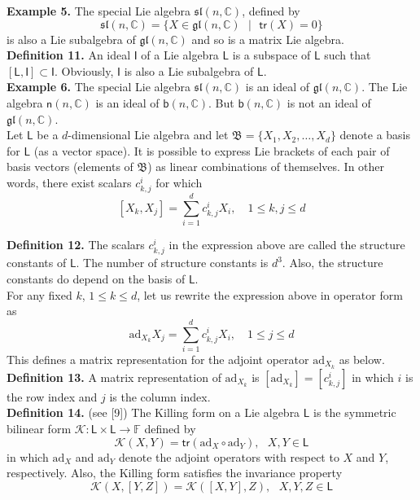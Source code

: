 \documentclass[11pt,a4paper]{article}
\begin{document}
\textbf{Example 5.} The special Lie algebra $\mathfrak{sl}(n,\mathbb{C})$, defined by
$$
\mathfrak{sl}(n,\mathbb{C}) = \{ X \in \mathfrak{gl}(n,\mathbb{C}) \text{ }\vert \text{ } \mathsf{tr}(X) = 0 \}
$$
is also a Lie subalgebra of $\mathfrak{gl}(n,\mathbb{C})$  and so is a matrix Lie algebra.\\

\textbf{Definition 11.} An ideal $\mathsf{I}$ of a Lie algebra $\mathsf{L}$ is a subspace of $\mathsf{L}$ such that $[\mathsf{L},\mathsf{I}] \subset \mathsf{I}$. Obviously, $\mathsf{I}$ is also a Lie subalgebra of $\mathsf{L}$.\\

\textbf{Example 6.} The special Lie algebra $\mathfrak{sl}(n,\mathbb{C})$ is an ideal of $\mathfrak{gl}(n,\mathbb{C})$. The Lie algebra
$\mathsf{n}(n,\mathbb{C})$ is an ideal of
$\mathsf{b}(n,\mathbb{C})$. But $\mathsf{b}(n,\mathbb{C})$ is not an ideal of $\mathfrak{gl}(n,\mathbb{C})$.\\

Let $\mathsf{L}$ be a $d$-dimensional Lie algebra and let $\mathfrak{B} = \{X_1, X_2, \dots, X_d \}$ denote a basis for $\mathsf{L}$ (as a vector space). It is possible to express Lie brackets of each pair of basis vectors (elements of $\mathfrak{B}$) as linear combinations of themselves. In other words, there exist scalars $c^i_{k,j}$ for which
$$
[X_k, X_j] = \sum _{i=1}^d c^i_{k,j} X_i, \quad 1 \leq k,j \leq d
$$

\textbf{Definition 12.} The scalars $c^i_{k,j}$ in the expression above are called the structure constants of $\mathsf{L}$. The number of structure constants is $d^3$. Also, the structure constants do depend on the basis of $\mathsf{L}$.\\

For any fixed $k$, $1 \leq k \leq d$, let us rewrite the expression above in operator form as
$$
\mathrm{ad}_{X_k} X_j = \sum _{i=1}^d c^i_{k,j} X_i, \quad 1 \leq j \leq d
$$
This defines a matrix representation for the adjoint operator $\mathrm{ad}_{X_k}$ as below.\\

\textbf{Definition 13.} A matrix representation of $\mathrm{ad}_{X_k}$ is
$
[\mathrm{ad}_{X_k}] = [c^i_{k,j}]
$
in which $i$ is the row index and $j$ is the column index.\\

\textbf{Definition 14.} (see [9]) The Killing form on a Lie algebra $\mathsf{L}$ is the symmetric bilinear form $\mathcal{K}: \mathsf{L} \times \mathsf{L} \rightarrow \mathbb{F}$ defined by
$$
\mathcal{K}(X,Y) = \mathsf{tr}(\mathrm{ad}_X \circ \mathrm{ad}_Y), \text{ } X, Y \in \mathsf{L}
$$
in which $\mathrm{ad}_X$ and $\mathrm{ad}_Y$ denote the adjoint operators with respect to $X$ and $Y$, respectively. Also, the Killing form satisfies the invariance property
$$
\mathcal{K}(X,[Y,Z]) = \mathcal{K}([X,Y],Z), \text{ }
X,Y,Z \in \mathsf{L}
$$
\end{document}
